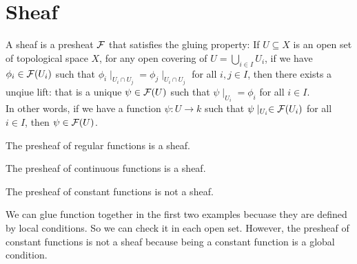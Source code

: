 \documentclass[12pt]{scrartcl}
\begin{document}
\section{Sheaf}
\begin{definition}
    A sheaf is a presheat $\mathcal F$ that satisfies the gluing property:
    If $U\subseteq X$ is an open set of topological space $X$, for any open covering of $U=\bigcup_{i\in I}U_i$, if we have $\phi_i\in \mathcal F(U_i)$ such that ${\phi_i}\mid_{U_i\cap U_j}={\phi_j}\mid_{U_i\cap U_j}$ for all $i,j\in I$, then there exists a unqiue lift: that is a unique $\psi \in \mathcal F(U)$ such that $\psi\mid_{U_i}=\phi_i$ for all $i\in I$.
    \\

    In other words, if we have a function $\psi: U \to k$ such that $\psi\mid_{U_i}\in \mathcal F(U_i)$ for all $i\in I$, then $\psi\in \mathcal F(U)$.
\end{definition}
\begin{example}
    The presheaf of regular functions is a sheaf.
\end{example}
\begin{example}
    The presheaf of continuous functions is a sheaf.
\end{example}
\begin{example}
    The presheaf of constant functions is not a sheaf.
\end{example}
\begin{remark}
    We can glue function together in the first two examples becuase they are defined by local conditions. So we can check it in each open set. However, the presheaf of constant functions is not a sheaf because being a constant function is a global condition. 
\end{remark}

\end{document}
